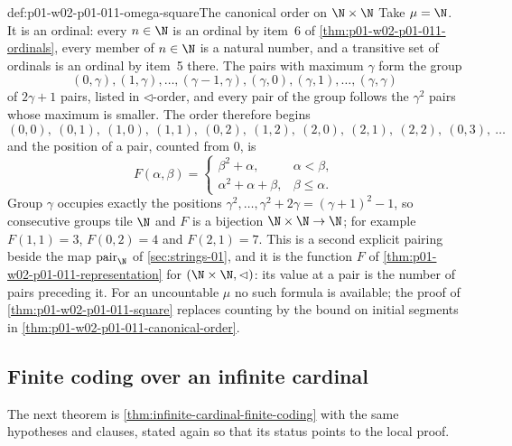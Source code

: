 \begin{hbexample}{def:p01-w02-p01-011-omega-square}{The canonical order on \(\N\times\N\)}
Take \(\mu=\N\). It is an ordinal: every \(n\in\N\) is an ordinal by item~6
of \cref{thm:p01-w02-p01-011-ordinals}, every member of \(n\in\N\) is a
natural number, and a transitive set of ordinals is an ordinal by item~5
there. The pairs with maximum \(\gamma\) form the group
\[
  (0,\gamma),(1,\gamma),\ldots,(\gamma-1,\gamma),(\gamma,0),(\gamma,1),\ldots,(\gamma,\gamma)
\]
of \(2\gamma+1\) pairs, listed in \(\lhd\)-order, and every pair of the group
follows the \(\gamma^2\) pairs whose maximum is smaller. The order therefore
begins
\[
  (0,0),\ (0,1),\ (1,0),\ (1,1),\ (0,2),\ (1,2),\ (2,0),\ (2,1),\ (2,2),\ (0,3),\ \ldots
\]
and the position of a pair, counted from \(0\), is
\[
  F(\alpha,\beta)=
  \begin{cases}
    \beta^2+\alpha,&\alpha<\beta,\\
    \alpha^2+\alpha+\beta,&\beta\leq\alpha.
  \end{cases}
\]
Group \(\gamma\) occupies exactly the positions \(\gamma^2,\ldots,\gamma^2+2\gamma=(\gamma+1)^2-1\),
so consecutive groups tile \(\N\) and \(F\) is a bijection
\(\N\times\N\to\N\); for example \(F(1,1)=3\), \(F(0,2)=4\) and
\(F(2,1)=7\). This is a second explicit pairing beside the map
\(\operatorname{pair}_{\N}\) of \cref{sec:strings-01}, and it is the
function \(F\) of \cref{thm:p01-w02-p01-011-representation} for
\((\N\times\N,\lhd)\): its value at a pair is the number of pairs
preceding it. For an uncountable \(\mu\) no such formula is
available; the proof of \cref{thm:p01-w02-p01-011-square} replaces counting
by the bound on initial segments in
\cref{thm:p01-w02-p01-011-canonical-order}.
\end{hbexample}

\subsection{Finite coding over an infinite cardinal}
\label{sec:p01-w02-p01-011-coding}

The next theorem is \cref{thm:infinite-cardinal-finite-coding} with the same
hypotheses and clauses, stated again so that its status points to the local
proof.

